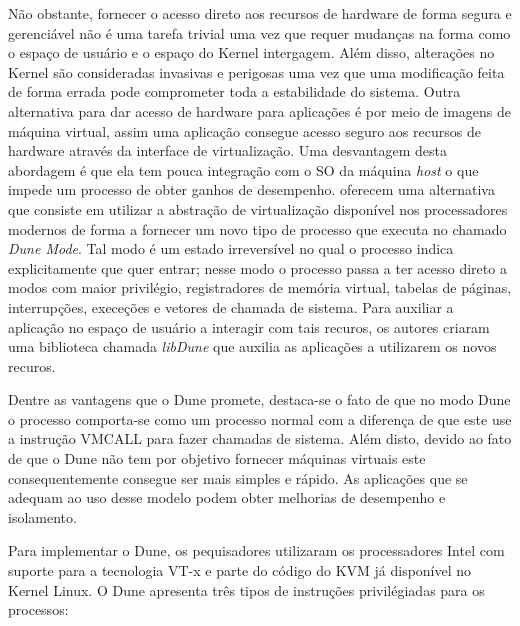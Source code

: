 Não obstante, fornecer o acesso direto aos recursos de hardware de forma segura
e gerenciável não é uma tarefa trivial uma vez que requer mudanças na forma
como o espaço de usuário e o espaço do Kernel intergagem. Além disso,
alterações no Kernel são consideradas invasivas e perigosas uma vez que uma
modificação feita de forma errada pode comprometer toda a estabilidade do
sistema. Outra alternativa para dar acesso de hardware para aplicações é por
meio de imagens de máquina virtual, assim uma aplicação consegue acesso seguro
aos recursos de hardware através da interface de virtualização. Uma desvantagem
desta abordagem é que ela tem pouca integração com o SO da máquina \emph{host}
o que impede um processo de obter ganhos de desempenho.  \citep{belay} oferecem
uma alternativa que consiste em utilizar a abstração de virtualização
disponível nos processadores modernos de forma a fornecer um novo tipo de
processo que executa no chamado \emph{Dune Mode}. Tal modo é um estado
irreversível no qual o processo indica explicitamente que quer entrar; nesse
modo o processo passa a ter acesso direto a modos com maior privilégio,
registradores de memória virtual, tabelas de páginas, interrupções, execeções e
vetores de chamada de sistema. Para auxiliar a aplicação no espaço de usuário a
interagir com tais recuros, os autores criaram uma biblioteca chamada
\emph{libDune} que auxilia as aplicações a utilizarem os novos recuros.

Dentre as vantagens que o Dune promete, destaca-se o fato de que no modo Dune o
processo comporta-se como um processo normal com a diferença de que este use a
instrução VMCALL para fazer chamadas de sistema. Além disto, devido ao fato de
que o Dune não tem por objetivo fornecer máquinas virtuais este
consequentemente consegue ser mais simples e rápido. As aplicações que se
adequam ao uso desse modelo podem obter melhorias de desempenho e isolamento.

Para implementar o Dune, os pequisadores utilizaram os processadores Intel com
suporte para a tecnologia VT-x e parte do código do KVM já disponível no Kernel
Linux. O Dune apresenta três tipos de instruções privilégiadas para os
processos:

